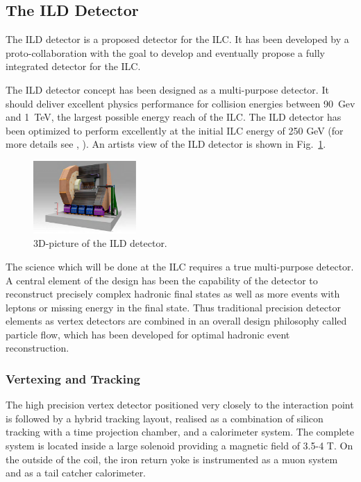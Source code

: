\subsection{The ILD Detector}
The ILD detector is a proposed detector for the ILC. It has been developed by a proto-collaboration with the goal to develop and eventually propose a fully integrated detector for the ILC. 

The ILD detector concept has been designed as a multi-purpose detector. It should deliver excellent physics performance for collision energies between 90~Gev and 1~TeV, the largest possible energy reach of the ILC. The ILD detector has been optimized to perform excellently at the initial ILC energy of 250 GeV (for more details see \cite{ild:bib:ILDloi}, \cite{ild:bib:ILDDBD}). An artists view of the ILD detector is shown in Fig.~\ref{fig:ild_3d}. 
\begin{figure}
    \centering
    \includegraphics[width=0.35\textwidth]{../figures/ILD.pdf}
    \caption{3D-picture of the ILD detector.}
    \label{fig:ild_3d}
\end{figure}

The science which will be done at the ILC requires a true multi-purpose detector. A central element of the design has been the capability of the detector to reconstruct precisely complex hadronic final states as well as more events with leptons or missing energy in the final state. Thus traditional precision detector elements as vertex detectors are combined in an overall design philosophy called particle flow, which has been developed for optimal hadronic event reconstruction.

\subsubsection{Vertexing and Tracking}
\label{subsubsec:ILDtracker}
The high precision vertex detector positioned very closely to the interaction point is followed by a hybrid tracking layout, realised as a combination of silicon tracking with a time projection chamber, and a calorimeter system. The complete system is located inside a large solenoid providing a magnetic field of 3.5-4 T. On the outside of the coil, the iron return yoke is instrumented as a muon system and as a tail catcher calorimeter. 

